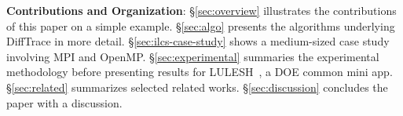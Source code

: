 {\bf Contributions and Organization\/}:
\S\ref{sec:overview} illustrates the contributions of this paper on a simple example.
%
\S\ref{sec:algo} presents the algorithms underlying DiffTrace in more detail.
%
\S\ref{sec:ilcs-case-study} shows a medium-sized case study involving MPI and OpenMP.
%
\S\ref{sec:experimental} summaries the experimental methodology before presenting results for LULESH~\cite{lulesh}, a DOE common mini app.
%
\S\ref{sec:related} summarizes selected related works.
%
\S\ref{sec:discussion} concludes the paper with a discussion.

% 
% 
% 
% 
% 


